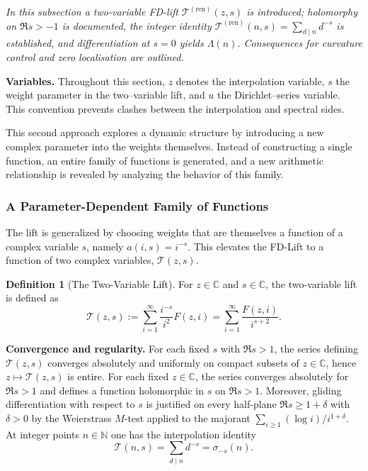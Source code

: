 \documentclass[11pt,a4paper]{amsart}
\newcommand{\C}{\mathbb{C}}
\theoremstyle{plain}
\theoremstyle{definition}
\newtheorem{definition}[theorem]{Definition}
\theoremstyle{remark}
\begin{document}
\par\smallskip
\noindent\textit{In this subsection a two-variable FD-lift $\mathcal T^{(\mathrm{ren})}(z,s)$ is introduced; holomorphy on $\Re s>-1$ is documented, the integer identity $\mathcal T^{(\mathrm{ren})}(n,s)=\sum_{d\mid n}d^{-s}$ is established, and differentiation at $s=0$ yields $\Lambda(n)$. Consequences for curvature control and zero localisation are outlined.}
\par\medskip


\noindent\textbf{Variables.} Throughout this section, $z$ denotes the interpolation variable, $s$ the weight parameter in the two--variable lift, and $u$ the Dirichlet--series variable. This convention prevents clashes between the interpolation and spectral sides.

This second approach explores a dynamic structure by introducing a new complex parameter into the weights themselves. Instead of constructing a single function, an entire family of functions is generated, and a new arithmetic relationship is revealed by analyzing the behavior of this family.

\subsubsection{A Parameter-Dependent Family of Functions}
The lift is generalized by choosing weights that are themselves a function of a complex variable $s$, namely $a(i,s) = i^{-s}$. This elevates the FD-Lift to a function of two complex variables, $\mathcal{T}(z,s)$.

\begin{definition}[The Two-Variable Lift]
For $z \in \C$ and $s \in \C$, the two-variable lift is defined as
\[\mathcal{T}(z,s) := \sum_{i=1}^{\infty} \frac{i^{-s}}{i^2} F(z,i) = \sum_{i=1}^{\infty} \frac{F(z,i)}{i^{s+2}}.\]
\end{definition}

\noindent\textbf{Convergence and regularity.}
For each fixed $s$ with $\Re s>1$, the series defining $\mathcal{T}(z,s)$ converges absolutely and uniformly on compact subsets of $z\in\C$, hence $z\mapsto\mathcal{T}(z,s)$ is entire.
For each fixed $z\in\C$, the series converges absolutely for $\Re s>1$ and defines a function holomorphic in $s$ on $\Re s>1$.
Moreover, gliding differentiation with respect to $s$ is justified on every half-plane $\Re s\ge 1+\delta$ with $\delta>0$ by the Weierstrass $M$-test applied to the majorant $\sum_{i\ge1}(\log i)/i^{1+\delta}$.
At integer points $n\in\mathbb{N}$ one has the interpolation identity
\[
\mathcal{T}(n,s)=\sum_{d\mid n} d^{-s}=\sigma_{-s}(n).
\]
\end{document}
